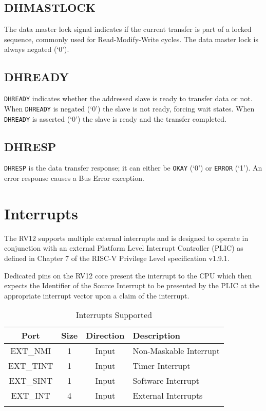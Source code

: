 \subsection{DHMASTLOCK}\label{dhmastlock}

The data master lock signal indicates if the current transfer is part of
a locked sequence, commonly used for Read-Modify-Write cycles. The data
master lock is always negated (`0').

\subsection{DHREADY}\label{dhready}

\texttt{DHREADY} indicates whether the addressed slave is ready to transfer data
or not. When \texttt{DHREADY} is negated (`0') the slave is not ready, forcing
wait states. When \texttt{DHREADY} is asserted (`0') the slave is ready and the
transfer completed.

\subsection{DHRESP}\label{dhresp}

\texttt{DHRESP} is the data transfer response; it can either be \texttt{OKAY} (`0') or
\texttt{ERROR} (`1'). An error response causes a Bus Error exception.

\section{Interrupts}\label{interrupts}

The RV12 supports multiple external interrupts and is designed to
operate in conjunction with an external Platform Level Interrupt
Controller (PLIC) as defined in Chapter 7 of the RISC-V Privilege Level
specification v1.9.1.

Dedicated pins on the RV12 core present the interrupt to the CPU which
then expects the Identifier of the Source Interrupt to be presented by
the PLIC at the appropriate interrupt vector upon a claim of the
interrupt.

\begin{longtable}[]{@{}cccl@{}}
\toprule
Port & Size & Direction & Description\tabularnewline
\midrule
\endhead
EXT\_NMI & 1 & Input & Non-Maskable Interrupt\tabularnewline
EXT\_TINT & 1 & Input & Timer Interrupt\tabularnewline
EXT\_SINT & 1 & Input & Software Interrupt\tabularnewline
EXT\_INT & 4 & Input & External Interrupts\tabularnewline
\bottomrule
\caption{Interrupts Supported}
\label{tab:int-support}
\end{longtable}

